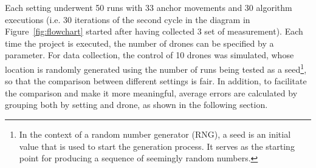 Each setting underwent 50 runs with 33 anchor movements and 30 algorithm executions (i.e. 30 iterations of the second cycle in the diagram in Figure~\ref{fig:flowchart} started after having collected 3 set of measurement). Each time the project is executed, the number of drones can be specified by a parameter. For data collection, the control of 10 drones was simulated, whose location is randomly generated using the number of runs being tested as a seed\footnote{In the context of a random number generator (RNG), a seed is an initial value that is used to start the generation process. It serves as the starting point for producing a sequence of seemingly random numbers.}, so that the comparison between different settings is fair. In addition, to facilitate the comparison and make it more meaningful, average errors are calculated by grouping both by setting and drone, as shown in the following section.

